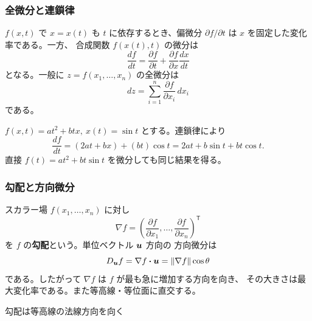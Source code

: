 \subsubsection{全微分と連鎖律}

$f(x,t)$ で $x=x(t)$ も $t$ に依存するとき、偏微分
$\partial f/\partial t$ は $x$ を固定した変化率である。一方、
合成関数 $f(x(t),t)$ の微分は
\begin{equation}
 \boxed{\frac{df}{dt}
 =\frac{\partial f}{\partial t}
 +\frac{\partial f}{\partial x}\frac{dx}{dt}}
\end{equation}
となる。一般に $z=f(x_1,\ldots,x_n)$ の全微分は
\[
 dz=\sum_{i=1}^n\frac{\partial f}{\partial x_i}\,dx_i
\]
である。

\begin{example}
$f(x,t)=at^2+btx,\ x(t)=\sin t$ とする。連鎖律により
\[
 \frac{df}{dt}=(2at+bx)+(bt)\cos t
 =2at+b\sin t+bt\cos t.
\]
直接 $f(t)=at^2+bt\sin t$ を微分しても同じ結果を得る。
\end{example}

\subsubsection{勾配と方向微分}

スカラー場 $f(x_1,\ldots,x_n)$ に対し
\begin{equation}
 \boxed{\nabla f
 =\left(\frac{\partial f}{\partial x_1},\ldots,
 \frac{\partial f}{\partial x_n}\right)^{\mathsf T}}
\end{equation}
を $f$ の\textbf{勾配}という。単位ベクトル $\bm{u}$ 方向の
方向微分は
\[
 D_{\bm{u}}f=\nabla f\mathbin{\boldsymbol{\cdot}}\bm{u}
 =\lVert\nabla f\rVert\cos\theta
\]
である。したがって $\nabla f$ は $f$ が最も急に増加する方向を向き、
その大きさは最大変化率である。また等高線・等位面に直交する。

\begin{center}

\small 勾配は等高線の法線方向を向く
\end{center}
